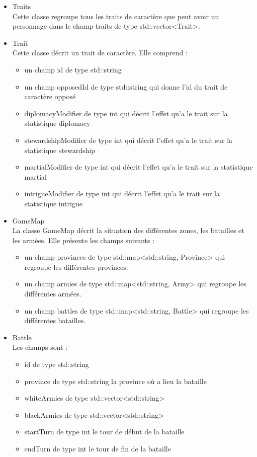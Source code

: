 \documentclass[a4paper,12pt]{article}
\begin{document}
\begin{itemize}
\item Traits\\
Cette classe regroupe tous les traits de caractère que peut avoir un personnage dans le champ traits de type std::vector<Trait>.
\item Trait\\
Cette classe décrit un trait de caractère. Elle comprend :
\begin{itemize}
\item un champ id de type std::string
\item un champ opposedId de type std::string qui donne l'id du trait de caractère opposé
\item diplomacyModifier de type int qui décrit l'effet qu'a le trait sur la statistique diplomacy
\item stewardshipModifier de type int qui décrit l'effet qu'a le trait sur la statistique stewardship
\item martialModifier de type int qui décrit l'effet qu'a le trait sur la statistique martial
\item intrigueModifier de type int qui décrit l'effet qu'a le trait sur la statistique intrigue
\end{itemize}

\item GameMap\\
La classe GameMap décrit la situation des différentes zones, les batailles et les armées. 
Elle présente les champs suivants :
\begin{itemize}
\item un champ provinces de type std::map<std::string, Province> qui regroupe les différentes provinces.
\item un champ armies de type std::map<std::string, Army> qui regroupe les différentes armées.
\item un champ battles de type std::map<std::string, Battle> qui regroupe les différentes batailles.
\end{itemize} 

\item Battle\\
Les champs sont :
\begin{itemize}
\item id de type std::string
\item province de type std::string la province où a lieu la bataille
\item whiteArmies de type std::vector<std::string>
\item blackArmies de type std::vector<std::string>
\item startTurn de type int le tour de début de la bataille
\item endTurn de type int le tour de fin de la bataille
\end{itemize}


\end{itemize}
\end{document}
